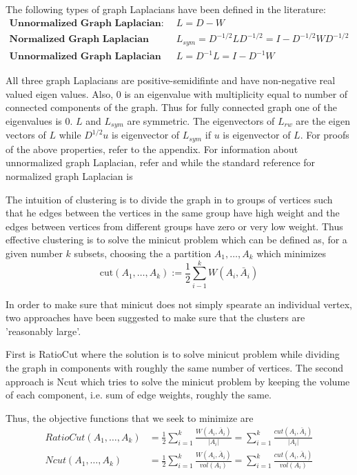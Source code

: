 \documentclass[10pt,a4paper, nocenter]{report}
\begin{document}
        The following types of graph Laplacians have been defined in the literature:
        \begin{align*}
         \textbf{Unnormalized Graph Laplacian: } &L = D- W \\
         \textbf{Normalized Graph Laplacian (Symmetric): } &L_{sym} = D^{-1/2}LD^{-1/2} = I - D^{-1/2}WD^{-1/2} \\
         \textbf{Unnormalized Graph Laplacian (Raondom walk): } &L = D^{-1}L = I - D^{-1}W 
        \end{align*}

        All three graph Laplacians are positive-semidifinte and have non-negative real valued eigen values. Also, 0 is an eigenvalue with multiplicity equal to number of connected components of the graph. Thus for fully connected graph one of the eigenvalues is 0. $L$ and $L_{sym}$ are symmetric. The eigenvectors of $L_{rw}$ are the eigen vectors of $L$ while $D^{1/2}u$ is eigenvector of $L_{sym}$ if $u$ is eigenvector of $L$. For proofs of the above properties, refer to the appendix. For information about unnormalized graph Laplacian, refer \cite{mohar-1991} and \cite{mohar-1997} while the standard reference for normalized graph Laplacian is \cite{graph-spectral-book}

        The intuition of clustering is to divide the graph in to groups of vertices such that he edges between the vertices in the same group have high weight and the edges between vertices from different groups have zero or very low weight. Thus effective clustering is to solve the minicut problem which can be defined as, for a given number $k$ subsets, choosing the a partition $A_{1}, \dots, A_{k}$ which minimizes $$ \text{cut}(A_{1}, \dots, A_{k}) := \frac{1}{2}\sum_{i-1}^{k}W(A_i,\bar{A}_{i}) $$

        In order to make sure that minicut does not simply spearate an individual vertex, two approaches have been suggested to make sure that the clusters are 'reasonably large'. 

        First is RatioCut \cite{hagen-kahng-1992} where the solution is to solve minicut problem while dividing the graph in components with roughly the same number of vertices. The second approach is Ncut \cite{Shi-Malik-maxcut-00} which tries to solve the minicut problem by keeping the volume of each component, i.e. sum of edge weights, roughly the same.
        
        Thus, the objective functions that we seek to minimize are
        \begin{align*}
            RatioCut(A_{1},\dots,A_{k}) &= \frac{1}{2} \sum_{i=1}^{k}\frac{W(A_{i},\bar{A}_{i})}{\lvert A_{i} \rvert}
            = \sum_{i=1}^{k}\frac{cut(A_{i},\bar{A}_{i})}{\lvert A_{i} \rvert} \\
            Ncut(A_{1},\dots,A_{k}) &= \frac{1}{2}\sum_{i=1}^{k}\frac{W(A_{i},\bar{A}_{i})}{vol(A_{i})} = 
            \sum_{i=1}^{k}\frac{cut(A_{i},\bar{A}_{i})}{vol(A_{i})}
        \end{align*}
    
\end{document}
